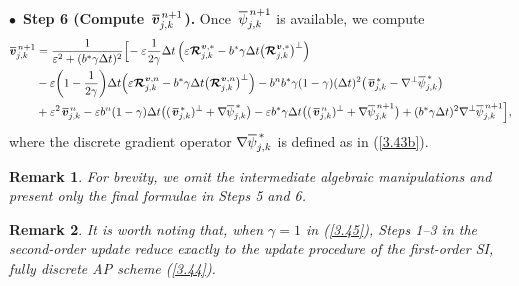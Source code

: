 \documentclass[a4paper,11pt,twoside]{article}
\newtheorem{rmk}{Remark}[section]
\numberwithin{equation}{section}
\numberwithin{figure}{section}
\numberwithin{table}{section}
\newcommand{\eps}{\varepsilon}
\newcommand{\dt}{\Delta t}
\newcommand{\bv}{\bm{v}}
\newcommand\eref[1]{(\ref{#1})}
\newcommand*\xbar[1]{%
	\hbox{%
		\vbox{%
			\hrule height 0.5pt %
			\kern0.3ex%
			\hbox{%
				\kern-0.05em%
				\ensuremath{#1}%
				\kern-0.02em%
			}%
		}%
	}%
}
\begin{document}
\smallskip
\noindent
$\bullet\,$ \textbf{Step 6 (Compute $\,\xbar{\bv}^{\,n+1}_{j,k}$).} Once $\,\xbar\psi^{\,n+1}_{j,k}$ is available, we compute
\begin{equation*}
\begin{aligned}
\xbar{\bv}^{\,n+1}_{j,k}&=\frac{1}{\eps^2+(b^*\gamma\dt)^2}\Big[\!-\eps\frac{1}{2\gamma}\dt\left(\eps\bm{{\cal R}}^{\bv,*}_{j,k}
-b^*\gamma\dt\big(\bm{{\cal R}}^{\bv,*}_{j,k}\big)^\perp\right)\\
&-\eps\bigg(1-\frac{1}{2\gamma}\bigg)\dt\Big(\eps\bm{{\cal R}}^{\bv,n}_{j,k}-b^*\gamma\dt\big(\bm{{\cal R}}^{\bv,n}_{j,k}\big)^\perp\Big)
-b^nb^*\gamma(1-\gamma)(\dt)^2\big(\,\xbar{\bv}^{\,*}_{j,k}-\nabla^\perp\xbar\psi^{\,*}_{j,k}\big)\\
&+\eps^2\,\xbar{\bv}^{\,n}_{j,k}-\eps b^n(1-\gamma)\dt\big((\,\xbar{\bv}^{\,*}_{j,k})^\perp+\nabla\xbar\psi^{\,*}_{j,k}\big)
-\eps b^*\gamma\dt\big((\,\xbar{\bv}^{\,n}_{j,k})^\perp+\nabla\xbar\psi^{\,n+1}_{j,k}\big)+
(b^*\gamma\dt)^2\nabla^\perp\xbar\psi^{\,n+1}_{j,k}\Big],
\end{aligned}
\end{equation*}
where the discrete gradient operator $\nabla\xbar\psi^{\,*}_{j,k}$ is defined as in \eref{3.43b}.
\begin{rmk}
For brevity, we omit the intermediate algebraic manipulations and present only the final formulae in Steps 5 and 6.
\end{rmk}
\begin{rmk}
It is worth noting that, when $\gamma=1$ in \eref{3.45}, Steps 1--3 in the second-order update reduce exactly to the update procedure of 
the first-order SI, fully discrete AP scheme \eref{3.44}.
\end{rmk}

\end{document}
